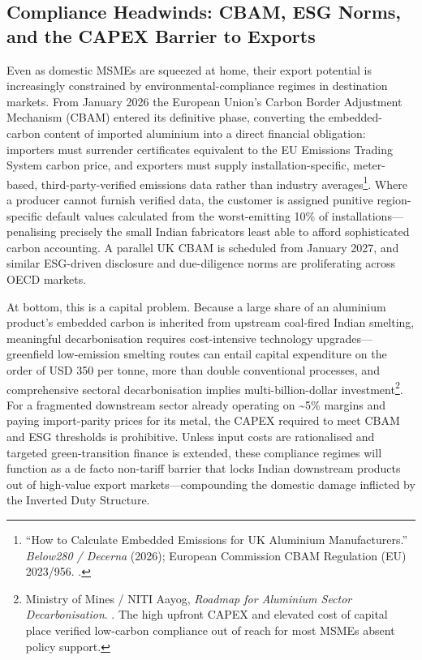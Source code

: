 \documentclass[11pt, a4paper]{article}
\numberwithin{figure}{section}
\numberwithin{table}{section}
\begin{document}
\subsection{Compliance Headwinds: CBAM, ESG Norms, and the CAPEX Barrier to Exports}
Even as domestic MSMEs are squeezed at home, their export potential is increasingly constrained by environmental-compliance regimes in destination markets. From January 2026 the European Union's Carbon Border Adjustment Mechanism (CBAM) entered its definitive phase, converting the embedded-carbon content of imported aluminium into a direct financial obligation: importers must surrender certificates equivalent to the EU Emissions Trading System carbon price, and exporters must supply installation-specific, meter-based, third-party-verified emissions data rather than industry averages\footnote{``How to Calculate Embedded Emissions for UK Aluminium Manufacturers.'' \textit{Below280 / Decerna} (2026); European Commission CBAM Regulation (EU) 2023/956. \cite{cbam2026}.}. Where a producer cannot furnish verified data, the customer is assigned punitive region-specific default values calculated from the worst-emitting 10\% of installations—penalising precisely the small Indian fabricators least able to afford sophisticated carbon accounting. A parallel UK CBAM is scheduled from January 2027, and similar ESG-driven disclosure and due-diligence norms are proliferating across OECD markets.

At bottom, this is a capital problem. Because a large share of an aluminium product's embedded carbon is inherited from upstream coal-fired Indian smelting, meaningful decarbonisation requires cost-intensive technology upgrades—greenfield low-emission smelting routes can entail capital expenditure on the order of USD 350 per tonne, more than double conventional processes, and comprehensive sectoral decarbonisation implies multi-billion-dollar investment\footnote{Ministry of Mines / NITI Aayog, \textit{Roadmap for Aluminium Sector Decarbonisation}. \cite{roadmap2025}. The high upfront CAPEX and elevated cost of capital place verified low-carbon compliance out of reach for most MSMEs absent policy support.}. For a fragmented downstream sector already operating on \textasciitilde5\% margins and paying import-parity prices for its metal, the CAPEX required to meet CBAM and ESG thresholds is prohibitive. Unless input costs are rationalised and targeted green-transition finance is extended, these compliance regimes will function as a de facto non-tariff barrier that locks Indian downstream products out of high-value export markets—compounding the domestic damage inflicted by the Inverted Duty Structure.
\end{document}
